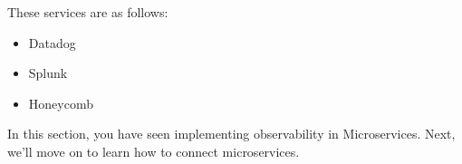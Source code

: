 These services are as follows:

\begin{itemize}
\item 
Datadog

\item 
Splunk

\item 
Honeycomb
\end{itemize}

In this section, you have seen implementing observability in Microservices. Next, we'll move on to learn how to connect microservices. 













